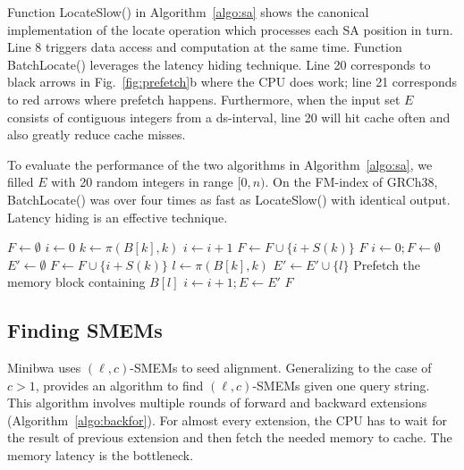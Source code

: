 \documentclass[webpdf,contemporary,large,namedate]{oup-authoring-template}%
\begin{document}
Function {\sc LocateSlow()} in Algorithm~\ref{algo:sa} shows the canonical implementation of the locate operation which processes each SA position in turn.
Line 8 triggers data access and computation at the same time.
Function {\sc BatchLocate()} leverages the latency hiding technique.
Line 20 corresponds to black arrows in Fig.~\ref{fig:prefetch}b where the CPU does work;
line 21 corresponds to red arrows where prefetch happens.
Furthermore, when the input set $E$ consists of contiguous integers from a ds-interval,
line 20 will hit cache often and also greatly reduce cache misses.

To evaluate the performance of the two algorithms in Algorithm~\ref{algo:sa},
we filled $E$ with 20 random integers in range $[0,n)$.
On the FM-index of GRCh38, {\sc BatchLocate()} was over four times as fast as {\sc LocateSlow()} with identical output.
Latency hiding is an effective technique.

\begin{algorithm}[bt]
	\caption{Retrieve chromosomal positions}\label{algo:sa}
	\begin{algorithmic}[1]
			\State $F\gets\emptyset$
				\State $i\gets0$
					\State $k\gets\pi(B[k],k)$
					\State $i\gets i+1$
				\EndWhile
				\State $F\gets F\cup\{i+S(k)\}$
			\EndFor
			\State \Return $F$
		\EndFunction
			\State $i\gets0; F\gets\emptyset$
				\State $E'\gets\emptyset$
						\State $F\gets F\cup\{i+S(k)\}$
					\Else
						\State $l\gets\pi(B[k],k)$
						\State $E'\gets E'\cup\{l\}$
						\State Prefetch the memory block containing $B[l]$
					\EndIf
				\EndFor
				\State $i\gets i+1; E\gets E'$
			\EndWhile
			\State \Return $F$
		\EndFunction
	\end{algorithmic}
\end{algorithm}

\subsection{Finding SMEMs}\label{sec:smem}

Minibwa uses $(\ell,c)$-SMEMs to seed alignment.
Generalizing \citet{DBLP:conf/dlt/Gagie24} to the case of $c>1$,
\citet{Li:2024ac} provides an algorithm to find $(\ell,c)$-SMEMs given one query string.
This algorithm involves multiple rounds of forward and backward extensions (Algorithm~\ref{algo:backfor}).
For almost every extension, the CPU has to wait for the result of previous extension and then fetch the needed memory to cache.
The memory latency is the bottleneck.
\end{document}

